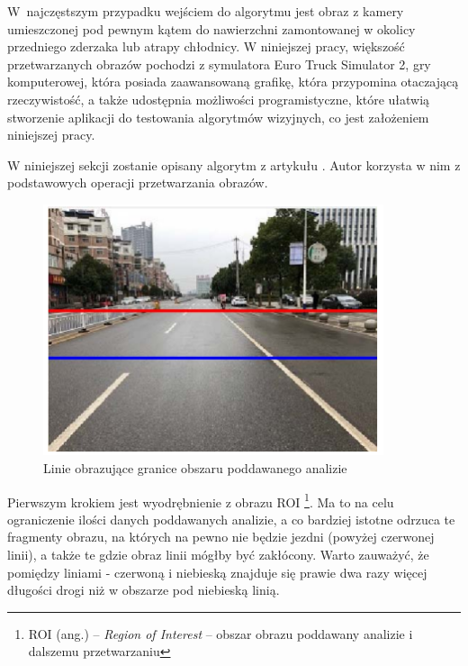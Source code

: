 W~najczęstszym przypadku wejściem do algorytmu jest obraz z kamery umieszczonej pod pewnym kątem do nawierzchni zamontowanej w okolicy przedniego zderzaka lub atrapy chłodnicy. %
W niniejszej pracy, większość przetwarzanych obrazów pochodzi z symulatora Euro Truck Simulator 2, gry komputerowej, która posiada zaawansowaną grafikę, która przypomina otaczającą rzeczywistość, a także udostępnia możliwości programistyczne, które ułatwią stworzenie aplikacji do testowania algorytmów wizyjnych, co jest założeniem niniejszej pracy. %

W niniejszej sekcji zostanie opisany algorytm z artykułu \cite{T3}. %
Autor korzysta w nim z podstawowych operacji przetwarzania obrazów. 



\begin{figure}
  \centering
  \includegraphics[width=10cm]{img/roi.png}
  \caption{Linie obrazujące granice obszaru poddawanego analizie\cite{T3}}
  \label{fig:roi}
\end{figure}

Pierwszym krokiem jest wyodrębnienie z obrazu ROI \footnote{ROI (ang.) -- \textit{Region of Interest} -- obszar obrazu poddawany analizie i dalszemu przetwarzaniu}. %
Ma to na celu ograniczenie ilości danych poddawanych analizie, a co bardziej istotne odrzuca te fragmenty obrazu, na których na pewno nie będzie jezdni (powyżej czerwonej linii), a także te gdzie obraz linii mógłby być zakłócony. 
Warto zauważyć, że pomiędzy liniami - czerwoną i niebieską znajduje się prawie dwa razy więcej długości drogi niż w obszarze pod niebieską linią.

